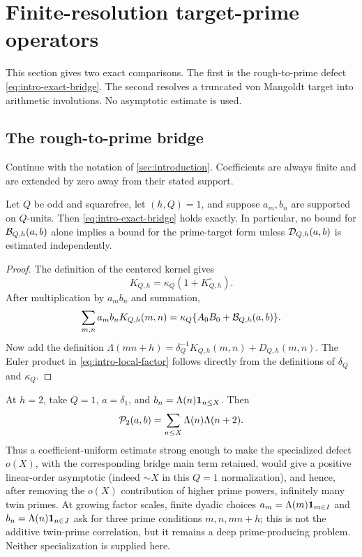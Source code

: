 \section{Finite-resolution target-prime operators}\label{sec:local-operators}

This section gives two exact comparisons.  The first is the rough-to-prime
defect \eqref{eq:intro-exact-bridge}.  The second resolves a truncated von
Mangoldt target into arithmetic involutions.  No asymptotic estimate is used.

\subsection{The rough-to-prime bridge}

Continue with the notation of \cref{sec:introduction}.  Coefficients are
always finite and are extended by zero away from their stated support.

\begin{proposition}\label{prop:exact-rough-prime-defect}
Let $Q$ be odd and squarefree, let $(h,Q)=1$, and suppose $a_m,b_n$ are
supported on $Q$-units.  Then \eqref{eq:intro-exact-bridge} holds exactly.
In particular, no bound for $\mathcal B_{Q,h}(a,b)$ alone implies a bound for the
prime-target form unless $\mathcal D_{Q,h}(a,b)$ is estimated independently.
\end{proposition}

\begin{proof}
The definition of the centered kernel gives
\[
 K_{Q,h}=\kappa_Q(1+K_{Q,h}^{\circ}).
\]
After multiplication by $a_mb_n$ and summation,
\[
 \sum_{m,n}a_mb_nK_{Q,h}(m,n)
 =\kappa_Q\{A_0B_0+\mathcal B_{Q,h}(a,b)\}.
\]
Now add the definition
$\Lambda(mn+h)=\delta_Q^{-1}K_{Q,h}(m,n)+D_{Q,h}(m,n)$.
The Euler product in \eqref{eq:intro-local-factor} follows directly from the
definitions of $\delta_Q$ and $\kappa_Q$.
\end{proof}

\begin{remark}\label{rem:dangerous-specializations}
At $h=2$, take $Q=1$, $a=\delta_1$, and
$b_n=\Lambda(n)\mathbf 1_{n\leq X}$.  Then
\[
 \mathcal P_2(a,b)=\sum_{n\leq X}\Lambda(n)\Lambda(n+2).
\]
Thus a coefficient-uniform estimate strong enough to make the specialized
defect $o(X)$, with the corresponding bridge main term retained, would give
a positive linear-order asymptotic (indeed $\sim X$ in this $Q=1$
normalization), and hence, after removing the $o(X)$ contribution of higher
prime powers, infinitely many twin primes.  At growing factor
scales, finite dyadic choices
$a_m=\Lambda(m)\mathbf 1_{m\in I}$ and
$b_n=\Lambda(n)\mathbf 1_{n\in J}$ ask for three prime conditions
$m,n,mn+h$; this is not the additive twin-prime correlation, but it remains
a deep prime-producing problem.  Neither specialization is supplied here.
\end{remark}

